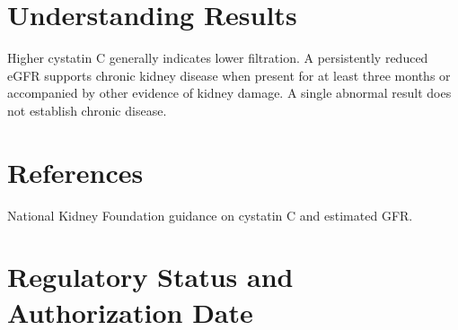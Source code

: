 \section*{Understanding Results}
Higher cystatin C generally indicates lower filtration. A persistently reduced eGFR supports chronic kidney disease when present for at least three months or accompanied by other evidence of kidney damage. A single abnormal result does not establish chronic disease.

\section*{References}
National Kidney Foundation guidance on cystatin C and estimated GFR.

\clearpage


\section*{Regulatory Status and Authorization Date}

\clearpage
